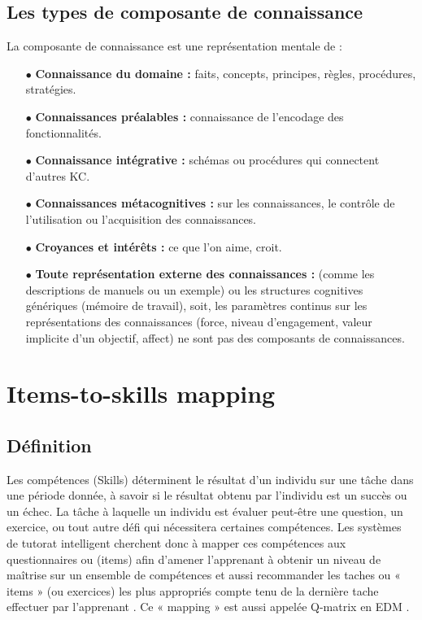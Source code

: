 \subsection{Les types de composante de connaissance}

La composante de connaissance est une représentation mentale de : \cite{chang2006learning}

\begin{itemize}
    \item[$\bullet$] \textbf{Connaissance du domaine :} faits, concepts, principes, règles, procédures, stratégies.
    \item[$\bullet$] \textbf{Connaissances préalables :} connaissance de l'encodage des fonctionnalités.
    \item[$\bullet$] \textbf{Connaissance intégrative :} schémas ou procédures qui connectent d'autres KC.
    \item[$\bullet$] \textbf{Connaissances métacognitives :} sur les connaissances, le contrôle de l'utilisation ou l'acquisition des connaissances.
    \item[$\bullet$] \textbf{Croyances et intérêts :} ce que l'on aime, croit.
    \item[$\bullet$] \textbf{Toute représentation externe des connaissances :} (comme les descriptions de manuels ou un exemple) ou les structures cognitives génériques (mémoire de travail), soit, les paramètres continus sur les représentations des connaissances (force, niveau d'engagement, valeur implicite d'un objectif, affect) ne sont pas des composants de connaissances.
\end{itemize}

\section{Items-to-skills mapping}
\subsection{Définition}
Les compétences (Skills) déterminent le résultat d'un individu sur une tâche dans une période donnée, à savoir si le résultat obtenu par l'individu est un succès ou un échec. La tâche à laquelle un individu est évaluer peut-être une question, un exercice, ou tout autre défi qui nécessitera certaines compétences. Les systèmes de tutorat intelligent cherchent donc à mapper ces compétences aux questionnaires ou (items) afin d'amener l'apprenant à obtenir un niveau de maîtrise sur un ensemble de compétences et aussi recommander les taches ou « items » (ou exercices) les plus appropriés compte tenu de la dernière tache effectuer par l’apprenant \cite{desmarais2012mapping}. Ce « mapping » est aussi appelée Q-matrix en EDM \cite{baker2009state}.
